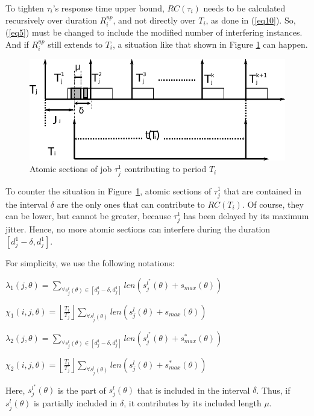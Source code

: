 \documentclass[12pt,english]{report}
\begin{document}
To tighten $\tau_{i}$'s response time upper bound, $RC(\tau_i)$ needs to be calculated recursively over duration $R_i^{up}$, 
and not directly over $T_i$, as done in (\ref{eq10}). So, (\ref{eq5}) must be changed to include the modified number of interfering instances. And if $R_i^{up}$ still extends to $T_i$, a situation like that shown in Figure
\ref{fig10} can happen.
\begin{figure}
\centering{}\includegraphics[scale=0.5]{figures/figure10}\caption{\label{fig10} Atomic sections of job $\tau_{j}^{1}$ contributing to period $T_i$}
\end{figure}


To counter the situation in Figure~\ref{fig10}, atomic sections of $\tau_{j}^{1}$ that are contained in the interval $\delta$
are the only ones that can contribute to $RC(T_{i})$. Of course, they can be lower, but cannot be greater, because $\tau_{j}^{1}$ has been delayed by its maximum jitter. Hence, no more atomic sections
can interfere during the duration 
$[d_j^1 -\delta,d_j^1]$.

For simplicity, we use the following notations:
\begin{compactitem}
\item $\lambda_{1}\left(j,\theta\right)=\sum_{\forall s_{j}^{l}\left(\theta\right)\in\left[d_j^1-\delta,d_j^1\right]}len\left(s_{j}^{l^{*}}\left(\theta\right)+s_{max}\left(\theta\right)\right)$
\item $\chi_{1}\left(i,j,\theta\right)=\left\lfloor\frac{T_{i}}{T_{j}}\right\rfloor\sum_{\forall s_{j}^{l}\left(\theta\right)}len\left(s_{j}^{l}\left(\theta\right)+s_{max}\left(\theta\right)\right)$
\item $\lambda_{2}\left(j,\theta\right)=\sum_{\forall s_{j}^{l}\left(\theta\right)\in\left[d_{j}^{1}-\delta,d_{j}^{1}\right]}len\left(s_{j}^{l^{*}}\left(\theta\right)+s_{max}^{*}\left(\theta\right)\right)$
\item $\chi_{2}\left(i,j,\theta\right)=\left\lfloor\frac{T_{i}}{T_{j}}\right\rfloor\sum_{\forall s_{j}^{l}\left(\theta\right)}len\left(s_{j}^{l}\left(\theta\right)+s_{max}^{*}\left(\theta\right)\right)$
\end{compactitem}
Here, $s_{j}^{l^{*}}\left(\theta\right)$ is the part of $s_{j}^{l}\left(\theta\right)$ that
is included in the interval $\delta$. Thus, if $s_j^l (\theta)$ is partially included in $\delta$, it contributes by its included length $\mu$.
\end{document}
